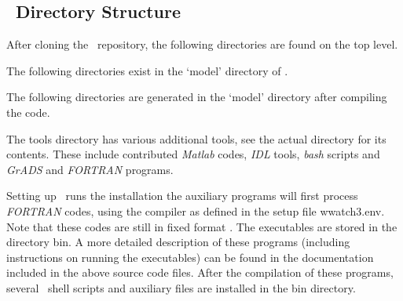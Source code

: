 \vssub
\subsection{~Directory Structure}
\vssub

After cloning the \ws\ repository, the following directories are found on the 
top level. 

\begin{dlist}
\end{dlist}

\noindent The following directories exist in the `model' directory of \ws.
 
\begin{dlist}
\end{dlist}

\noindent The following directories are generated in the `model' directory 
after compiling the code. 

\begin{dlist}
\end{dlist}

\noindent

The  {\dir tools} directory has various additional tools, see the actual directory
for its contents. These include contributed {\it Matlab} codes, 
{\it IDL} tools, {\it bash} scripts and {\it GrADS} and {\it FORTRAN} programs.

Setting up \ws\ runs the installation the auxiliary programs will first process 
{\it FORTRAN} codes,
using the compiler as defined in the setup file {\file wwatch3.env}. 
Note that these codes are still in fixed format {}. The 
executables are stored in the directory {\dir bin}. A more detailed
description of these programs (including instructions on running the
executables) can be found in the documentation included in the above source
code files. After the compilation of these programs, several \unix\ shell
scripts and auxiliary files are installed in the {\dir bin} directory.

\begin{flist}


\end{flist}

